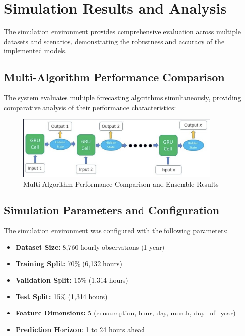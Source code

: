 \documentclass[12pt,a4paper]{report}
\begin{document}
\section{Simulation Results and Analysis}
The simulation environment provides comprehensive evaluation across multiple datasets and scenarios, demonstrating the robustness and accuracy of the implemented models.

\subsection{Multi-Algorithm Performance Comparison}
The system evaluates multiple forecasting algorithms simultaneously, providing comparative analysis of their performance characteristics:

\begin{figure}[H]
    \centering
    \includegraphics[width=0.9\textwidth]{4.png}
    \caption{Multi-Algorithm Performance Comparison and Ensemble Results}
    \label{fig:algorithm_comparison}
\end{figure}

\subsection{Simulation Parameters and Configuration}
The simulation environment was configured with the following parameters:
\begin{itemize}
\item \textbf{Dataset Size:} 8,760 hourly observations (1 year)
\item \textbf{Training Split:} 70\% (6,132 hours)
\item \textbf{Validation Split:} 15\% (1,314 hours)
\item \textbf{Test Split:} 15\% (1,314 hours)
\item \textbf{Feature Dimensions:} 5 (consumption, hour, day, month, day\_of\_year)
\item \textbf{Prediction Horizon:} 1 to 24 hours ahead
\end{itemize}
\end{document}
